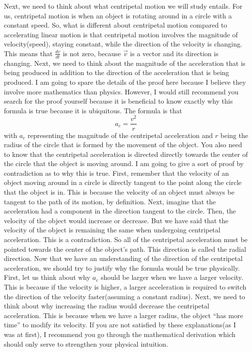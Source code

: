 Next, we need to think about what centripetal motion we will study entails. For us, centripetal motion is when an object is rotating around in a circle with a constant speed. So, what is different about centripetal motion compared to accelerating linear motion is that centripetal motion involves the magnitude of velocity(speed), staying constant, while the direction of the velocity is changing. This means that $\frac{dv}{dt}$ is not zero, because $\vec{v}$ is a vector and its direction is changing. Next, we need to think about the magnitude of the acceleration that is being produced in addition to the direction of the acceleration that is being produced. I am going to spare the details of the proof here because I believe they involve more mathematics than physics. However, I would still recommend you search for the proof yourself because it is beneficial to know exactly why this formula is true because it is ubiquitous. The formula is that \begin{equation}a_c=\frac{v^2}{r}\end{equation} with $a_c$ representing the magnitude of the centripetal acceleration and $r$ being the radius of the circle that is formed by the movement of the object. You also need to know that the centripetal acceleration is directed directly towards the center of the circle that the object is moving around. I am going to give a sort of proof by contradiction as to why this is true. First, remember that the velocity of an object moving around in a circle is directly tangent to the point along the circle that the object is in. This is because the velocity of an object must always be tangent to the path of its motion, by definition. Next, imagine that the acceleration had a component in the direction tangent to the circle. Then, the velocity of the object would increase or decrease. But we have said that the velocity of the object is remaining the same when undergoing centripetal acceleration. This is a contradiction. So all of the centripetal acceleration must be pointed towards the center of the object's path. This direction is called the radial direction. Now that we have an understanding of the direction of the centripetal acceleration, we should try to justify why the formula would be true physically. First, let us think about why $a_c$ should be larger when we have a larger velocity. This is because if the velocity is higher, a larger acceleration is required to switch the direction of the velocity faster(assuming a constant radius). Next, we need to think about why increasing the radius would decrease the centripetal acceleration. This is because when we have a larger radius, the object “has more time” to modify its velocity. If you are not satisfied by these explanations(as I was at first), I recommend you go through the mathematical derivation which should only serve to strengthen your physical intuition. 

